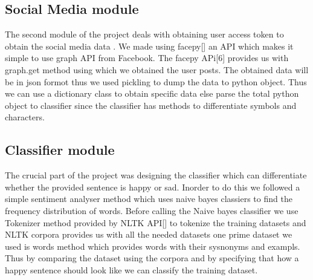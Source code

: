 \documentclass{chi2009}
\begin{document}
\begin{Abstract}
\subsection{Social Media module}


The second module of the project deals with obtaining user access token to obtain the social media data . We made using facepy[] an API which makes it simple to use graph API from Facebook. The facepy APi[6] provides us with graph.get method using which we obtained the user posts. The obtained data will be in json formot thus we used pickling to dump the data to python object. Thus we can use a dictionary class to obtain specific data else parse the total python object to classifier since the classifier has methods to differentiate symbols and characters.  








\subsection{Classifier module}


The crucial part of the project was designing the classifier which can differentiate whether the provided sentence is happy or sad. Inorder to do this we followed a simple sentiment analyser method which uses naive bayes classiers to find the frequency distribution of words. Before calling the Naive bayes classifier we use Tokenizer method provided by NLTK API[] to tokenize the training datasets and NLTK corpora provides us with all the needed datasets one prime dataset we used is words method which provides words with their sysnonyms and exampls. Thus by comparing the dataset using the corpora and by specifying that how a happy sentence should look like we can classify the training dataset. 



\end{Abstract}
\end{document}
